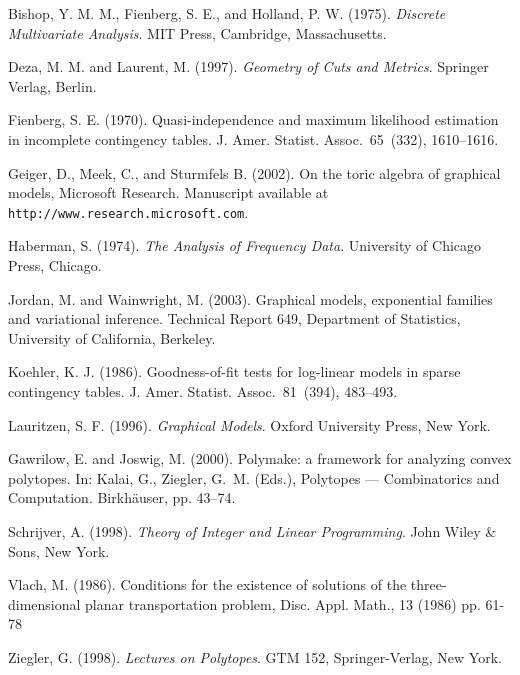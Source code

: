 \documentclass{elsart}
\begin{document}

\begin{thebibliography}{}
  Bishop, Y. M. M., Fienberg, S. E., and Holland, P. W. (1975). \textit{Discrete Multivariate Analysis}.  MIT Press, Cambridge, Massachusetts.

  Deza, M. M. and Laurent, M. (1997). \textit{Geometry
  of Cuts and Metrics}. Springer Verlag, Berlin.

 Fienberg, S. E. (1970). Quasi-independence and maximum likelihood estimation in incomplete contingency tables.  J. Amer. Statist. Assoc.~65~(332), 1610--1616.

  Geiger, D.,  Meek, C., and  Sturmfels B. (2002). On the toric algebra of graphical models, Microsoft Research. Manuscript available at \verb=http://www.research.microsoft.com=.

 Haberman, S. (1974). \textit{The Analysis of Frequency Data}. University of Chicago Press, Chicago.

  Jordan, M. and
 Wainwright, M. (2003). Graphical models, exponential families and
  variational inference. Technical Report 649, Department of
  Statistics, University of California, Berkeley. 

 Koehler, K. J. (1986). Goodness-of-fit tests for log-linear models in sparse contingency tables.  J. Amer. Statist. Assoc.~81~(394), 483--493.

  Lauritzen, S. F. (1996). \textit{Graphical Models}. Oxford University Press, New York.

 Gawrilow, E. and  Joswig, M. (2000).  Polymake: a framework for analyzing convex
  polytopes. In: Kalai, G., Ziegler, G.~M. (Eds.), Polytopes --- Combinatorics
  and Computation. Birkh\"auser, pp. 43--74.

 Schrijver, A. (1998). \textit{Theory of Integer and Linear Programming}. John Wiley \& Sons, New York.

 Vlach, M. (1986). Conditions for the existence of solutions of the three-dimensional planar transportation problem, Disc. Appl. Math., 13 (1986) pp. 61-78

 Ziegler, G. (1998). \textit{Lectures on Polytopes}.  GTM 152, Springer-Verlag, New York.
\end{thebibliography}
\end{document}
